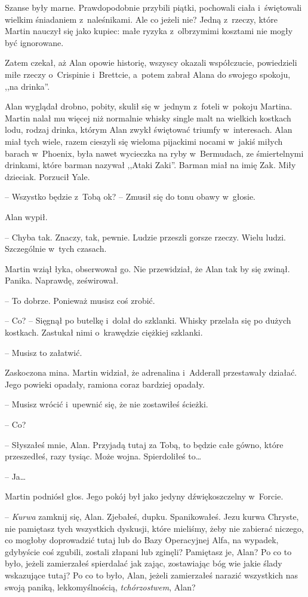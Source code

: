 \documentclass[oneside,polish,11pt,sfheadings]{mwbk}
\begin{document}
Szanse były marne. Prawdopodobnie przybili piątki, pochowali ciała i~świętowali wielkim śniadaniem z~naleśnikami. Ale co jeżeli nie? Jedną z~rzeczy, które Martin nauczył się jako kupiec: małe ryzyka z~olbrzymimi
kosztami nie mogły być ignorowane.

Zatem czekał, aż Alan opowie historię, wszyscy okazali współczucie,
powiedzieli miłe rzeczy o~Crispinie i~Brettcie, a~potem zabrał Alana do
swojego spokoju, ,,na drinka''.

Alan wyglądał drobno, pobity, skulił się w~jednym z~foteli w~pokoju
Martina. Martin nalał mu więcej niż normalnie whisky single malt na
wielkich kostkach lodu, rodzaj drinka, którym Alan zwykł świętować
triumfy w~interesach. Alan miał tych wiele, razem cieszyli się wieloma
pijackimi nocami w~jakiś miłych barach w~Phoenix, była nawet wycieczka
na ryby w~Bermudach, ze śmiertelnymi drinkami, które barman nazywał
,,Ataki Zaki''. Barman miał na imię Zak. Miły dzieciak. Porzucił Yale.

-- Wszystko będzie z~Tobą ok? -- Zmusił się do tonu obawy w~głosie.

Alan wypił. 

-- Chyba tak. Znaczy, tak, pewnie. Ludzie przeszli gorsze
rzeczy. Wielu ludzi. Szczególnie w~tych czasach.

Martin wziął łyka, obserwował go. Nie przewidział, że Alan tak by się
zwinął. Panika. Naprawdę, ześwirował. 

-- To dobrze. Ponieważ musisz coś
zrobić.

-- Co? -- Sięgnął po butelkę i~dolał do szklanki. Whisky przelała się po
dużych kostkach. Zastukał nimi o~krawędzie ciężkiej szklanki.

-- Musisz to załatwić.

Zaskoczona mina. Martin widział, że adrenalina i~Adderall przestawały
działać. Jego powieki opadały, ramiona coraz bardziej opadały.

-- Musisz wrócić i~upewnić się, że nie zostawiłeś ścieżki.

-- Co?

-- Słyszałeś mnie, Alan. Przyjadą tutaj za Tobą, to będzie całe gówno,
które przeszedłeś, razy tysiąc. Może wojna. Spierdoliłeś to\ldots 

-- Ja\ldots 

Martin podniósł głos. Jego pokój był jako jedyny dźwiękoszczelny w~Forcie. 

-- \textit{Kurwa} zamknij się, Alan. Zjebałeś, dupku. Spanikowałeś.
Jezu kurwa Chryste, nie pamiętasz tych wszystkich dyskusji, które
mieliśmy, żeby nie zabierać niczego, co mogłoby doprowadzić tutaj lub do
Bazy Operacyjnej Alfa, na wypadek, gdybyście coś zgubili, zostali
złapani lub zginęli? Pamiętasz je, Alan? Po co to było, jeżeli
zamierzałeś spierdalać jak zając, zostawiając bóg wie jakie ślady
wskazujące tutaj? Po co to było, Alan, jeżeli zamierzałeś narazić
wszystkich nas swoją paniką, lekkomyślnością, \textit{tchórzostwem}, Alan?
\end{document}
